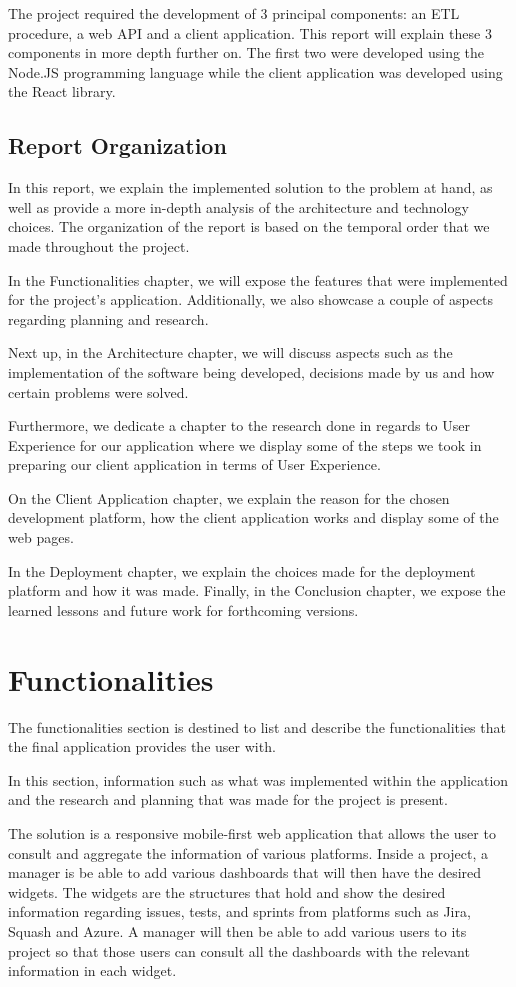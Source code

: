 \documentclass[a4paper,twoside,10pt]{report}
\begin{document}
The project required the development of 3 principal components: an ETL procedure, a web API and a client application. This report will explain these 3 components in more depth further on.
The first two were developed using the Node.JS programming language while the client application was developed using the React library.

\section{Report Organization}
In this report, we explain the implemented solution to the problem at hand, as well as provide a more in-depth analysis of the architecture and technology choices. The organization of the report is based on the temporal order that we made throughout the project.

In the Functionalities chapter, we will expose the features that were implemented for the project's application. Additionally, we also showcase a couple of aspects regarding planning and research.

Next up, in the Architecture chapter, we will discuss aspects such as the implementation of the software being developed, decisions made by us and how certain problems were solved.

Furthermore, we dedicate a chapter to the research done in regards to User Experience for our application where we display some of the steps we took in preparing our client application in terms of User Experience.

On the Client Application chapter, we explain the reason for the chosen development platform, how the client application works and display some of the web pages.  

In the Deployment chapter, we explain the choices made for the deployment platform and how it was made. Finally, in the Conclusion chapter, we expose the learned lessons and future work for forthcoming versions.

\chapter{Functionalities}
The functionalities section is destined to list and describe the functionalities that the final application provides the user with.

In this section, information such as what was implemented within the application and the research and planning that was made for the project is present.


The solution is a responsive mobile-first web application that allows the user to consult and aggregate the information of various platforms. Inside a project, a manager is be able to add various dashboards that will then have the desired widgets. The widgets are the structures that hold and show the desired information regarding issues, tests, and sprints from platforms such as Jira\cite{JIRA}, Squash\cite{SQUASH} and Azure\cite{AZURE}. A manager will then be able to add various users to its project so that those users can consult all the dashboards with the relevant information in each widget.
\end{document}
